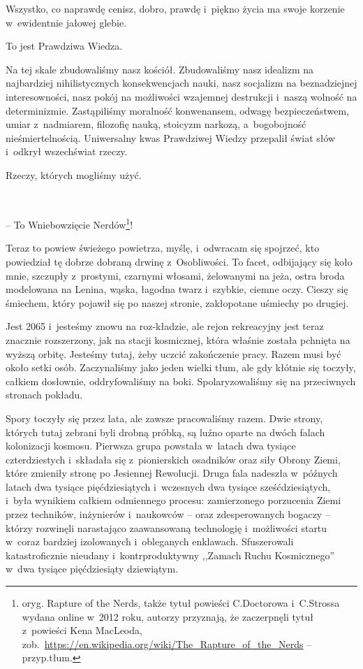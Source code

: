 \documentclass[oneside,polish,11pt,sfheadings]{mwbk}
\begin{document}
Wszystko, co naprawdę cenisz, dobro, prawdę i~piękno życia ma swoje
korzenie w~ewidentnie jałowej glebie.

To jest Prawdziwa Wiedza.

Na tej skale zbudowaliśmy nasz kościół. Zbudowaliśmy nasz idealizm na
najbardziej nihilistycznych konsekwencjach nauki, nasz socjalizm na
beznadziejnej interesowności, nasz pokój na możliwości wzajemnej
destrukcji i~naszą wolność na determinizmie. Zastąpiliśmy moralność
konwenansem, odwagę bezpieczeństwem, umiar z~nadmiarem, filozofię nauką,
stoicyzm narkozą, a~bogobojność nieśmiertelnością. Uniwersalny kwas
Prawdziwej Wiedzy przepalił świat słów i~odkrył wszechświat rzeczy.

Rzeczy, których mogliśmy użyć.

~

-- To Wniebowzięcie Nerdów\footnote{oryg. Rapture of the Nerds, także tytuł powieści C.Doctorowa i~C.Strossa wydana online w~2012 roku, autorzy przyznają, że zaczerpnęli
tytuł z~powieści Kena MacLeoda,
zob.~\url{https://en.wikipedia.org/wiki/The\_Rapture\_of\_the\_Nerds}
-- przyp.tłum.}!

Teraz to powiew świeżego powietrza, myślę, i~odwracam się spojrzeć, kto
powiedział tę dobrze dobraną drwinę z~Osobliwości. To facet, odbijający
się koło mnie, szczupły z~prostymi, czarnymi włosami, żelowanymi na
jeża, ostra broda modelowana na Lenina, wąska, łagodna twarz i~szybkie,
ciemne oczy. Cieszy się śmiechem, który pojawił się po naszej stronie,
zakłopotane uśmiechy po drugiej.

Jest 2065 i~jesteśmy znowu na roz-kładzie, ale rejon rekreacyjny jest
teraz znacznie rozszerzony, jak na stacji kosmicznej, która właśnie
została pchnięta na wyższą orbitę. Jesteśmy tutaj, żeby uczcić
zakończenie pracy. Razem musi być około setki osób. Zaczynaliśmy jako
jeden wielki tłum, ale gdy kłótnie się toczyły, całkiem dosłownie,
oddryfowaliśmy na boki. Spolaryzowaliśmy się na przeciwnych stronach
pokładu.

Spory toczyły się przez lata, ale zawsze pracowaliśmy razem. Dwie
strony, których tutaj zebrani byli drobną próbką, są luźno oparte na
dwóch falach kolonizacji kosmosu. Pierwsza grupa powstała w~latach dwa
tysiące czterdziestych i~składała się z~pionierskich osadników oraz siły
Obrony Ziemi, które zmieniły stronę po Jesiennej Rewolucji. Druga fala
nadeszła w~późnych latach dwa tysiące pięćdziesiątych i~wczesnych dwa
tysiące sześćdziesiątych, i~była wynikiem całkiem odmiennego procesu:
zamierzonego porzucenia Ziemi przez techników, inżynierów i~naukowców -- oraz zdesperowanych bogaczy -- którzy rozwinęli narastająco zaawansowaną
technologię i~możliwości startu w~coraz bardziej izolowanych i~obleganych enklawach. Sfuszerowali katastroficznie nieudany i~kontrproduktywny ,,Zamach Ruchu Kosmicznego'' w~dwa tysiące pięćdziesiąty dziewiątym.
\end{document}
